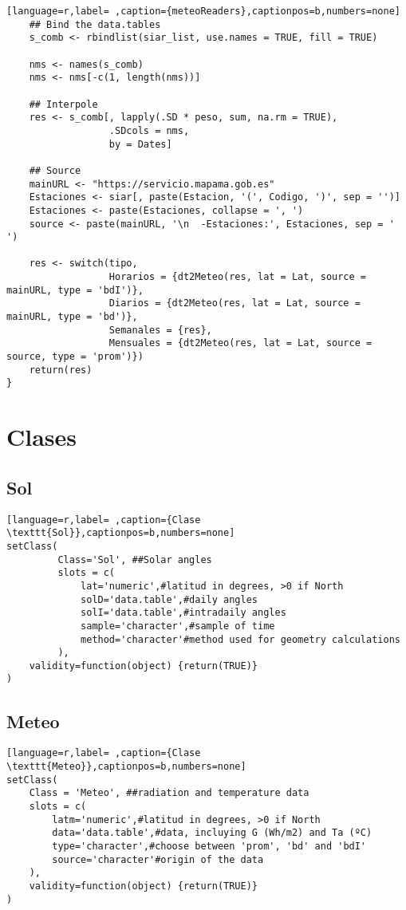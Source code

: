 \begin{lstlisting}[language=r,label= ,caption={meteoReaders},captionpos=b,numbers=none]
    ## Bind the data.tables
    s_comb <- rbindlist(siar_list, use.names = TRUE, fill = TRUE)

    nms <- names(s_comb)
    nms <- nms[-c(1, length(nms))]

    ## Interpole
    res <- s_comb[, lapply(.SD * peso, sum, na.rm = TRUE),
                  .SDcols = nms,
                  by = Dates]

    ## Source
    mainURL <- "https://servicio.mapama.gob.es"
    Estaciones <- siar[, paste(Estacion, '(', Codigo, ')', sep = '')]
    Estaciones <- paste(Estaciones, collapse = ', ')
    source <- paste(mainURL, '\n  -Estaciones:', Estaciones, sep = ' ')

    res <- switch(tipo,
                  Horarios = {dt2Meteo(res, lat = Lat, source = mainURL, type = 'bdI')},
                  Diarios = {dt2Meteo(res, lat = Lat, source = mainURL, type = 'bd')},
                  Semanales = {res},
                  Mensuales = {dt2Meteo(res, lat = Lat, source = source, type = 'prom')})
    return(res)
}
\end{lstlisting}

\section{Clases}
\label{sec:orgf47878f}
\subsection{Sol}
\label{sec:org170cf4f}
\label{subsec:sol}
\begin{lstlisting}[language=r,label= ,caption={Clase \texttt{Sol}},captionpos=b,numbers=none]
setClass(
         Class='Sol', ##Solar angles
         slots = c(
             lat='numeric',#latitud in degrees, >0 if North
             solD='data.table',#daily angles
             solI='data.table',#intradaily angles
             sample='character',#sample of time
             method='character'#method used for geometry calculations
         ),
    validity=function(object) {return(TRUE)}
)
\end{lstlisting}
\subsection{Meteo}
\label{sec:org3989bd3}
\label{subsec:meteo}
\begin{lstlisting}[language=r,label= ,caption={Clase \texttt{Meteo}},captionpos=b,numbers=none]
setClass(
    Class = 'Meteo', ##radiation and temperature data
    slots = c(
        latm='numeric',#latitud in degrees, >0 if North
        data='data.table',#data, incluying G (Wh/m2) and Ta (ºC)
        type='character',#choose between 'prom', 'bd' and 'bdI'
        source='character'#origin of the data
    ),
    validity=function(object) {return(TRUE)}
)
\end{lstlisting}
